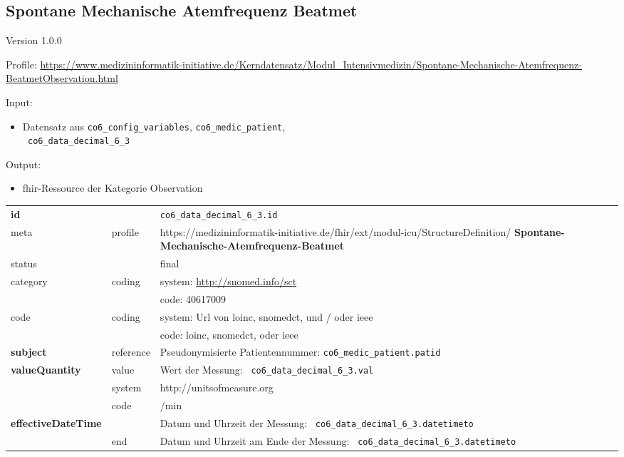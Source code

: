 \subsection{Spontane Mechanische Atemfrequenz Beatmet} 
\noindent Version 1.0.0

\noindent Profile: \url{https://www.medizininformatik-initiative.de/Kerndatensatz/Modul_Intensivmedizin/Spontane-Mechanische-Atemfrequenz-BeatmetObservation.html}

\noindent Input:
\begin{itemize}
	\item Datensatz aus \texttt{co6\_config\_variables}, \texttt{co6\_medic\_patient}, \\ \texttt{
co6\_data\_decimal\_6\_3}
\end{itemize}
Output:
\begin{itemize}
        \item \ac{fhir}-Ressource der Kategorie \glqq Observation\grqq{}
\end{itemize}
\begin{longtable}{|l|l|p{7.5cm}|}
        \hline
        \rowcolor{lightgray} \multicolumn{3}{|l|}{Data Mapping (inhaltlich)} \\ \hline
        \textbf{id} &  & \texttt{co6\_data\_decimal\_6\_3.id} \\ \hline
	meta & profile & https://medizininformatik-initiative.de/fhir/ext/modul-icu/StructureDefinition/\textbf{
Spontane-Mechanische-Atemfrequenz-Beatmet} \\ \hline 
	status &  & final   \\ \hline 
	category & coding & system: \url{http://snomed.info/sct} \\
\cline{3-3}
	& & code: 40617009 \\ \hline
	code & coding & system: Url von \ac{loinc}, \ac{snomedct}, und / oder \ac{ieee} \\ 
	\cline{3-3} 
	 &  & code: \ac{loinc}, \ac{snomedct}, oder \ac{ieee} \\ \hline
	 \textbf{subject}  & reference & Pseudonymisierte Patientennummer: \texttt{co6\_medic\_patient.patid} \\ \hline
	 \textbf{valueQuantity}  & value & Wert der Messung: \texttt{
co6\_data\_decimal\_6\_3.val} \\
        \cline{2-3}
         & system & http://unitsofmeasure.org \\
         \cline{2-3}
         & code & /min \\ \hline
     \textbf{effectiveDateTime}  & & Datum und Uhrzeit der Messung: \texttt{
co6\_data\_decimal\_6\_3.datetimeto} \\
    \cline{2-3}
     & end & Datum und Uhrzeit am Ende der Messung: \texttt{
co6\_data\_decimal\_6\_3.datetimeto} \\ \hline
\end{longtable}



